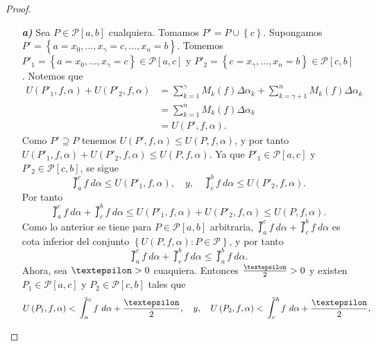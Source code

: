\begin{proof}

\begin{itemize}
  \item[\textbf{\textit{a)}}]Sea $P\in\mathcal{P}\left[a,b\right]$ cualquiera. Tomamos $P'=P\cup\left\lbrace c\right\rbrace$. Supongamos $P'=\left\lbrace a=x_0,\dots,x_\gamma=c,\dots,x_n=b\right\rbrace$. Tomemos $P'_1=\left\lbrace a=x_0,\dots,x_\gamma=c\right\rbrace\in\mathcal{P}\left[a,c\right]$ y $P'_2=\left\lbrace c=x_\gamma,\dots,x_n=b\right\rbrace\in\mathcal{P}\left[c,b\right]$. Notemos que
  \begin{align*}
  U\left(P'_1,f,\alpha\right)+U\left(P'_2,f,\alpha\right)&=\sum_{k=1}^{\gamma}M_k\left(f\right)\Delta\alpha_k+\sum_{k=\gamma+1}^{n}M_k\left(f\right)\Delta\alpha_k\\
  &=\sum_{k=1}^{n}M_k\left(f\right)\Delta\alpha_k\\
  &=U\left(P',f,\alpha\right).
  \end{align*}
  Como $P'\supseteq P$ tenemos $U\left(P',f,\alpha\right)\leq U\left(P,f,\alpha\right)$, y por tanto $U\left(P'_1,f,\alpha\right)+U\left(P'_2,f,\alpha\right)\leq U\left(P,f,\alpha\right)$. Ya que $P'_1\in\mathcal{P}\left[a,c\right]$ y $P'_2\in\mathcal{P}\left[c,b\right]$, se sigue
  \begin{equation*}
    \upint_a^c f\ d\alpha \leq U\left(P'_1,f,\alpha\right),\quad y,\quad \upint_c^b f\ d\alpha \leq U\left(P'_2,f,\alpha\right).
  \end{equation*}
  Por tanto
  \begin{equation*}
    \upint_a^c f\ d\alpha + \upint_c^b f\ d\alpha \leq U\left(P'_1,f,\alpha\right)+U\left(P'_2,f,\alpha\right)\leq U\left(P,f,\alpha\right).
  \end{equation*}
  Como lo anterior se tiene para $P\in\mathcal{P}\left[a,b\right]$ arbitraria, $\upint_a^c f\ d\alpha + \upint_c^b f\ d\alpha$ es cota inferior del conjunto $\left\lbrace U\left(P,f,\alpha\right):P\in\mathcal{P}\right\rbrace$, y por tanto
  \setcounter{equation}{0}
  \begin{equation}
    \upint_a^c f\ d\alpha + \upint_c^b f\ d\alpha \leq \upint_a^b f\ d\alpha.
  \end{equation}
  Ahora, sea $\text{\textepsilon}>0$ cuaquiera. Entonces $\frac{\text{\textepsilon}}{2}>0$ y existen $P_1\in\mathcal{P}\left[a,c\right]$ y $P_2\in\mathcal{P}\left[c,b\right]$ tales que
  \begin{equation*}
    U\left(P_1,f,\alpha\right)<\upint_a^c f\ d\alpha+\frac{\text{\textepsilon}}{2},\quad y,\quad U\left(P_2,f,\alpha\right)<\upint_c^b f\ d\alpha+\frac{\text{\textepsilon}}{2},

\end{equation*}
\end{itemize}
\end{proof}
